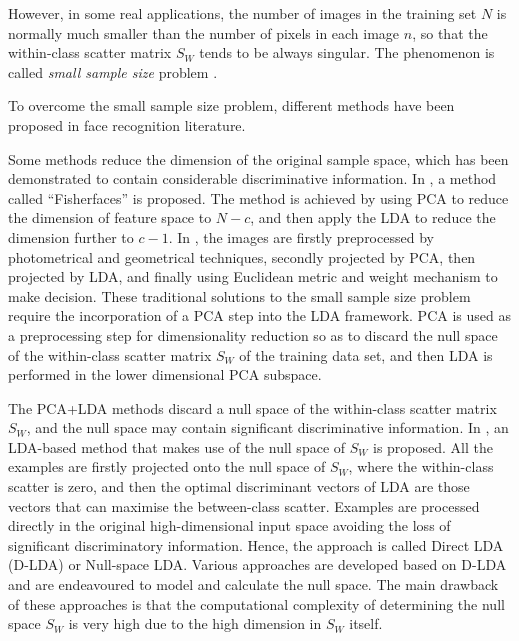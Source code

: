 However, in some real applications, the number of images in the training set $N$ is normally much smaller than the number of pixels in each image $n$, so that the within-class scatter matrix $S_W$ tends to be always singular. The phenomenon is called \textit{small sample size} problem \cite{Fukunaga1990}. 

To overcome the small sample size problem, different methods have been proposed in face recognition literature. 

Some methods reduce the dimension of the original sample space, which has been demonstrated to contain considerable discriminative information. In \cite{Belhumeur1997}, a method called ``Fisherfaces'' is proposed. The method is achieved by using PCA to reduce the dimension of feature space to $N-c$, and then apply the LDA to reduce the dimension further to $c-1$.  In \cite{Zhao1998}, the images are firstly preprocessed by photometrical and geometrical techniques, secondly projected by PCA, then projected by LDA, and finally using Euclidean metric and weight mechanism to make decision. These traditional solutions to the small sample size problem require the incorporation of a PCA step into the LDA framework. PCA is used as a preprocessing step for dimensionality reduction so as to discard the null space of the within-class scatter matrix $S_W$ of the training data set, and then LDA is performed in the lower dimensional PCA subspace.

The PCA+LDA methods discard a null space of the within-class scatter matrix $S_W$, and the null space may contain significant discriminative information. In \cite{Chen2000}, an LDA-based method that makes use of the null space of $S_W$ is proposed. All the examples are firstly projected onto the null space of $S_W$, where the within-class scatter is zero, and then the optimal discriminant vectors of LDA are those vectors that can maximise the between-class scatter. Examples are processed directly in the original high-dimensional input space avoiding the loss of significant discriminatory information. Hence, the approach is called Direct LDA (D-LDA) or Null-space LDA. Various approaches \cite{Huang2002,Lu2003,Wu2004,Cevikalp2004,Fan2004} are developed based on D-LDA and are endeavoured to model and calculate the null space. The main drawback of these approaches is that the computational complexity of determining the null space $S_W$ is very high due to the high dimension in $S_W$ itself.

